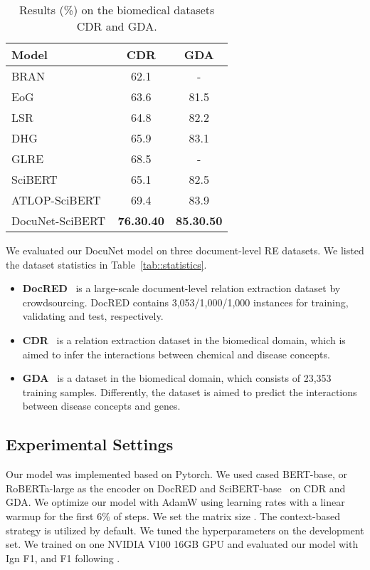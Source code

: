 \documentclass{article}
\begin{document}
\begin{table}[htbp]
\centering
\begin{tabular}{p{4.5cm}cc}
         \toprule
         \textbf{Model} & CDR& GDA \\
         \midrule
         BRAN~\cite{Verga2018SimultaneouslyST}& 62.1& - \\
         EoG~\cite{Christopoulou2019ConnectingTD}& 63.6& 81.5 \\
         LSR~\cite{Nan2020ReasoningWL}& 64.8& 82.2\\
         DHG~\cite{zhang2020document}& 65.9 & 83.1 \\
         GLRE~\cite{wang2020global}& 68.5 & - \\
         SciBERT~\cite{Beltagy2019SciBERTAP}& 65.1 & 82.5 \\
         ATLOP-SciBERT~\cite{zhou2020document}&  69.4 &  83.9 \\
         \midrule
         DocuNet-SciBERT& \textbf{76.30.40}  & \textbf{85.30.50}  \\
         \bottomrule
    \end{tabular}
\caption{Results (\%) on the biomedical datasets CDR and GDA.}
    \label{tab::bio_result}
\end{table}
 
 We evaluated our DocuNet model on three document-level RE datasets. We listed the dataset statistics in Table~\ref{tab::statistics}.
\begin{itemize}
    \item \textbf{DocRED}~\cite{Yao2019DocREDAL} is a large-scale document-level relation extraction dataset by crowdsourcing. DocRED contains 3,053/1,000/1,000 instances for training, validating and test, respectively.
    
    \item \textbf{CDR}~\cite{Li2016BioCreativeVC} is a relation extraction dataset in the biomedical domain, which is aimed to infer the interactions between chemical and disease concepts.
   
    \item \textbf{GDA}~\cite{Wu2019RENETAD} is a dataset in the biomedical domain, which consists of 23,353 training samples. Differently, the dataset is aimed to predict the interactions between disease concepts and genes.  
\end{itemize}
\subsection{Experimental Settings}
Our model was implemented based on Pytorch.
We used cased BERT-base, or RoBERTa-large as the encoder on DocRED and SciBERT-base~\cite{Beltagy2019SciBERTAP} on CDR and GDA. We optimize our model with AdamW using learning rates  with a linear warmup for the first 6\% of steps. We set the matrix size . The context-based strategy is utilized by default. We tuned the hyperparameters on the development set. We trained on one NVIDIA V100 16GB GPU and evaluated our model with Ign F1, and F1 following \cite{Yao2019DocREDAL}.  
\end{document}

